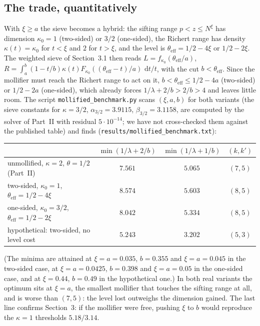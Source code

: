 \documentclass[11pt,a4paper]{article}
\theoremstyle{remark}
\theoremstyle{definition}
\newcommand{\dd}{\,\mathrm d}
\begin{document}
\subsection{The trade, quantitatively}
With $\xi\ge a$ the sieve becomes a hybrid: the sifting range $p<z\le N^\xi$ has dimension $\kappa_0=1$ (two-sided) or $3/2$ (one-sided), the Richert range has density $\kappa(t)=\kappa_0$ for $t<\xi$ and $2$ for $t>\xi$, and the level is $\theta_{\mathrm{eff}}=1/2-4\xi$ or $1/2-2\xi$. The weighted sieve of Section~3.1 then reads $L=f_{\kappa_0}(\theta_{\mathrm{eff}}/a)$, $R=\int_a^b(1-t/b)\kappa(t)F_{\kappa_0}((\theta_{\mathrm{eff}}-t)/a)\,\dd t/t$, with the cut $b<\theta_{\mathrm{eff}}$. Since the mollifier must reach the Richert range to act on it, $b<\theta_{\mathrm{eff}}\le1/2-4a$ (two-sided) or $1/2-2a$ (one-sided), which already forces $1/\lambda+2/b>2/b>4$ and leaves little room. The script \texttt{mollified\_benchmark.py} scans $(\xi,a,b)$ for both variants (the sieve constants for $\kappa=3/2$, $\alpha_{3/2}=3.9115$, $\beta_{3/2}=3.1158$, are computed by the solver of Part~II with residual $5\cdot10^{-14}$; we have not cross-checked them against the published table) and finds (\texttt{results/mollified\_benchmark.txt}):
\begin{center}\small
\begin{tabular}{l|cc|c}
\toprule
 & $\min(1/\lambda+2/b)$ & $\min(1/\lambda+1/b)$ & $(k,k')$\\
\midrule
unmollified, $\kappa=2$, $\theta=1/2$ (Part~II) & $7.561$ & $5.065$ & $(7,5)$\\
two-sided, $\kappa_0=1$, $\theta_{\mathrm{eff}}=1/2-4\xi$ & $8.574$ & $5.603$ & $(8,5)$\\
one-sided, $\kappa_0=3/2$, $\theta_{\mathrm{eff}}=1/2-2\xi$ & $8.042$ & $5.334$ & $(8,5)$\\
hypothetical: two-sided, no level cost & $5.243$ & $3.202$ & $(5,3)$\\
\bottomrule
\end{tabular}
\end{center}
(The minima are attained at $\xi=a=0.035$, $b=0.355$ and $\xi=a=0.045$ in the two-sided case, at $\xi=a=0.0425$, $b=0.398$ and $\xi=a=0.05$ in the one-sided case, and at $\xi=0.44$, $b=0.49$ in the hypothetical one.) In both real variants the optimum sits at $\xi=a$, the smallest mollifier that touches the sifting range at all, and is worse than $(7,5)$: the level lost outweighs the dimension gained. The last line confirms Section~3: if the mollifier were free, pushing $\xi$ to $b$ would reproduce the $\kappa=1$ thresholds $5.18/3.14$.
\end{document}
